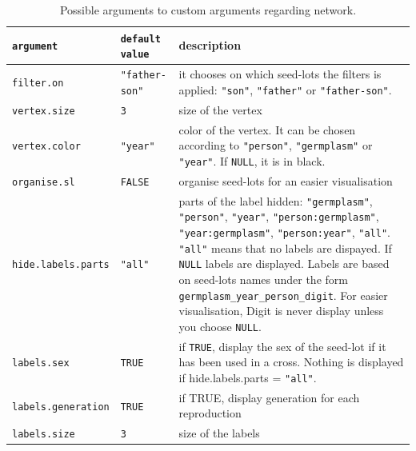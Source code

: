 \documentclass{article}\usepackage[]{graphicx}\usepackage[]{color}
\begin{document}
\begin{center}
\begin{table}[H]
\begin{tabular}{ p{} p{} p{} }
\hline
\texttt{argument} & \texttt{default value} & description \\
\hline

\texttt{filter.on} & \texttt{"father-son"} & it chooses on which seed-lots the filters is applied: \texttt{"son"}, \texttt{"father"} or \texttt{"father-son"}. \\

\texttt{vertex.size} & \texttt{3} &  size of the vertex \\

\texttt{vertex.color} & \texttt{"year"} & color of the vertex. 
It can be chosen according to  \texttt{"person"}, \texttt{"germplasm"} or \texttt{"year"}. 
If \texttt{NULL}, it is in black. \\

\texttt{organise.sl} & \texttt{FALSE} & organise seed-lots for an easier visualisation \\

\texttt{hide.labels.parts} & \texttt{"all"} & parts of the label hidden: \texttt{"germplasm"}, \texttt{"person"}, \texttt{"year"}, \texttt{"person:germplasm"}, \texttt{"year:germplasm"}, \texttt{"person:year"}, \texttt{"all"}. 
\texttt{"all"} means that no labels are dispayed. 
If \texttt{NULL} labels are displayed. Labels are based on seed-lots names under the form \texttt{germplasm\_year\_person\_digit}.
For easier visualisation, Digit is never display unless you choose \texttt{NULL}.
\\

\texttt{labels.sex} & \texttt{TRUE} & if \texttt{TRUE}, display the sex of the seed-lot if it has been used in a cross. Nothing is displayed if hide.labels.parts = \texttt{"all"}. \\

\texttt{labels.generation} & \texttt{TRUE} & if TRUE, display generation for each reproduction \\

\texttt{labels.size} & \texttt{3} & size of the labels \\
\hline
\end{tabular}
\caption{Possible arguments to custom arguments regarding network.}
\label{custom.network}
\end{table}
\end{center}
\end{document}
